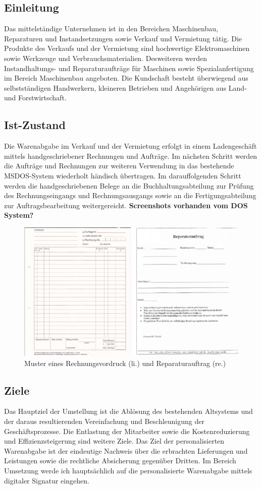 \subsection{Einleitung}
Das mittelständige Unternehmen ist in den Bereichen Maschinenbau, Reparaturen und Instandsetzungen sowie Verkauf und Vermietung tätig. Die Produkte des Verkaufs und der Vermietung sind hochwertige Elektromaschinen sowie Werkzeuge und Verbrauchsmaterialien. Desweiteren werden Instandhaltungs- und Reparaturaufträge für Maschinen sowie Spezialanfertigung im Bereich Maschinenbau angeboten. Die Kundschaft besteht überwiegend aus selbstständigen Handwerkern, kleineren Betrieben und Angehörigen aus Land- und Forstwirtschaft. \cite{einleitung1}
\subsection{Ist-Zustand}
Die Warenabgabe im Verkauf und der Vermietung erfolgt in einem Ladengeschäft mittels handgeschriebener Rechnungen und Aufträge. Im nächsten Schritt werden die Aufträge und Rechnungen zur weiteren Verwendung in das bestehende MSDOS-System wiederholt händisch übertragen. Im darauffolgenden Schritt werden die handgeschriebenen Belege an die Buchhaltungsabteilung zur Prüfung des Rechnungseingangs und Rechnungsausgangs sowie an die Fertigungsabteilung zur Auftragsbearbeitung weitergereicht. \textbf{Screenshots vorhanden vom DOS System?} \cite{einleitung1}
\begin{figure}[!ht]
    \centering
    \includegraphics{rechnungReparaturAlt2.png}
    \caption[Muster Rechnungsvordruck und Reparaturauftrag]{Muster eines Rechnungsvordruck (li.) und Reparaturauftrag (re.) \cite{einleitung1}}
    \label{fig:4}
\end{figure}
\subsection{Ziele}
Das Hauptziel der Umstellung ist die Ablösung des bestehenden Altsystems und der daraus resultierenden Vereinfachung und Beschleunigung der Geschäftsprozesse. Die Entlastung der Mitarbeiter sowie die Kostenreduzierung und Effizienzsteigerung sind weitere Ziele. Das Ziel der personalisierten Warenabgabe ist der eindeutige Nachweis über die erbrachten Lieferungen und Leistungen sowie die rechtliche Absicherung gegenüber Dritten. Im Bereich Umsetzung werde ich hauptsächlich auf die personalisierte Warenabgabe mittels digitaler Signatur eingehen. \cite{einleitung1}